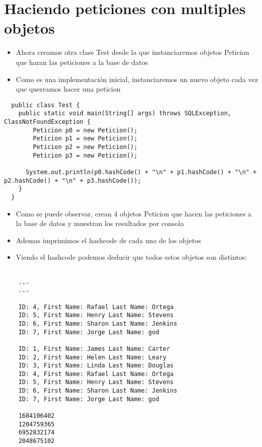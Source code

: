 \section{Haciendo peticiones con multiples objetos}

\begin{itemize}
  \item Ahora creamos otra clase Test desde la que instanciaremos objetos Peticion que haran las peticiones a la base de datos
  \item Como es una implementación inicial, instanciaremos un nuevo objeto cada vez que querramos hacer una peticion
\end{itemize}

\begin{lstlisting}
  public class Test {
    public static void main(String[] args) throws SQLException, ClassNotFoundException {
        Peticion p0 = new Peticion();
        Peticion p1 = new Peticion();
        Peticion p2 = new Peticion();
        Peticion p3 = new Peticion();

      System.out.println(p0.hashCode() + "\n" + p1.hashCode() + "\n" + p2.hashCode() + "\n" + p3.hashCode());
    }
  }
\end{lstlisting}

\begin{itemize}
  \item Como se puede observar, crean 4 objetos Peticion que hacen las peticiones a la base de datos y muestran los resultados por consola
  \item Ademas imprimimos el hashcode de cada uno de los objetos
  \item Viendo el hashcode podemos deducir que todos estos objetos son distintos:
\end{itemize}

\begin{lstlisting}

    ...
    ...

    ID: 4, First Name: Rafael Last Name: Ortega
    ID: 5, First Name: Henry Last Name: Stevens
    ID: 6, First Name: Sharon Last Name: Jenkins
    ID: 7, First Name: Jorge Last Name: god

    ID: 1, First Name: James Last Name: Carter
    ID: 2, First Name: Helen Last Name: Leary
    ID: 3, First Name: Linda Last Name: Douglas
    ID: 4, First Name: Rafael Last Name: Ortega
    ID: 5, First Name: Henry Last Name: Stevens
    ID: 6, First Name: Sharon Last Name: Jenkins
    ID: 7, First Name: Jorge Last Name: god

    1684106402
    1204759365
    6952832174
    2048675102

\end{lstlisting}

